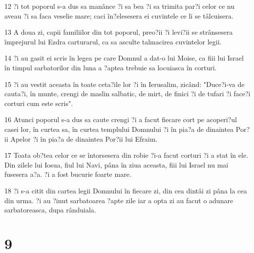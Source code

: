 \par 12 ?i tot poporul s-a dus sa manânce ?i sa bea ?i sa trimita par?i celor ce nu aveau ?i sa faca veselie mare; caci în?elesesera ei cuvintele ce li se tâlcuisera.
\par 13 A doua zi, capii familiilor din tot poporul, preo?ii ?i levi?ii se strânsesera împrejurul lui Ezdra carturarul, ca sa asculte talmacirea cuvintelor legii.
\par 14 ?i au gasit ei scris în legea pe care Domnul a dat-o lui Moise, ca fiii lui Israel în timpul sarbatorilor din luna a ?aptea trebuie sa locuiasca în corturi.
\par 15 ?i au vestit aceasta în toate ceta?ile lor ?i în Ierusalim, zicând: "Duce?i-va de cauta?i, în munte, crengi de maslin salbatic, de mirt, de finici ?i de tufari ?i face?i corturi cum este scris".
\par 16 Atunci poporul s-a dus sa caute crengi ?i a facut fiecare cort pe acoperi?ul casei lor, în curtea sa, în curtea templului Domnului ?i în pia?a de dinaintea Por?ii Apelor ?i în pia?a de dinaintea Por?ii lui Efraim.
\par 17 Toata ob?tea celor ce se întorsesera din robie ?i-a facut corturi ?i a stat în ele. Din zilele lui Iosua, fiul lui Navi, pâna în ziua aceasta, fiii lui Israel nu mai fusesera a?a. ?i a fost bucurie foarte mare.
\par 18 ?i s-a citit din cartea legii Domnului în fiecare zi, din cea dintâi zi pâna la cea din urma. ?i au ?inut sarbatoarea ?apte zile iar a opta zi au facut o adunare sarbatoreasca, dupa rânduiala.

\chapter{9}

